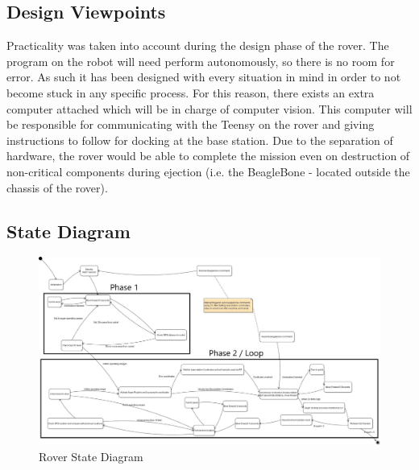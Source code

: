 \documentclass[journal,10pt,draftclsnofoot,onecolumn,compsoc]{IEEEtran} \usepackage[margin=0.75in]{geometry}
\begin{document}
\subsection{Design Viewpoints}
Practicality was taken into account during the design phase of the rover. The program on the robot will need perform autonomously, so there is no room for error. As such it has been designed with every situation in mind in order to not  become stuck in any specific process. For this reason, there exists an extra computer attached which will be in charge of computer vision. This computer will be responsible for communicating with the Teensy on the rover and giving instructions to follow for docking at the base station. Due to the separation of hardware, the rover would be able to complete the mission even on destruction of non-critical components during ejection (i.e. the BeagleBone - located outside the chassis of the rover). 

\newpage
\begin{landscape}
\subsection{State Diagram}
\vspace{1cm}
\begin{figure}[ht]
    \centering
    \includegraphics[width = 1.3 \textwidth,angle=0]{Figures/TeensyStateDiag.jpg}
    \caption{Rover State Diagram}
    \label{fig:my_label}
\end{figure}
\end{landscape}
\end{document}
